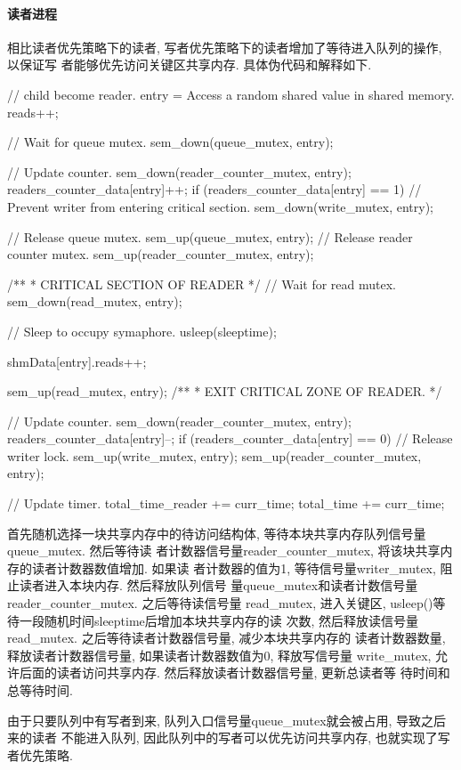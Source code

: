 \paragraph{读者进程}
相比读者优先策略下的读者, 写者优先策略下的读者增加了等待进入队列的操作, 以保证写
者能够优先访问关键区共享内存. 具体伪代码和解释如下.
\begin{code}
// child become reader.
    entry =  Access a random shared value in shared memory.
    reads++;

    // Wait for queue mutex.
    sem_down(queue_mutex, entry);

    // Update counter.
    sem_down(reader_counter_mutex, entry);
    readers_counter_data[entry]++;
    if (readers_counter_data[entry] == 1) {
            // Prevent writer from entering critical section.
            sem_down(write_mutex, entry);
        }

    // Release queue mutex.
    sem_up(queue_mutex, entry);
    // Release reader counter mutex.
    sem_up(reader_counter_mutex, entry);

    /**
    * CRITICAL SECTION OF READER
    */
    // Wait for read mutex.
    sem_down(read_mutex, entry);

    // Sleep to occupy symaphore.
    usleep(sleeptime);

    shmData[entry].reads++;

    sem_up(read_mutex, entry);
    /**
    * EXIT CRITICAL ZONE OF READER.
    */

    // Update counter.
    sem_down(reader_counter_mutex, entry);
    readers_counter_data[entry]--;
    if (readers_counter_data[entry] == 0) {
            // Release writer lock.
            sem_up(write_mutex, entry);
        }
    sem_up(reader_counter_mutex, entry);

    // Update timer.
    total_time_reader += curr_time;
    total_time += curr_time;

\end{code}

首先随机选择一块共享内存中的待访问结构体, 等待本块共享内存队列信号量queue\_mutex. 然后等待读
者计数器信号量reader\_counter\_mutex, 将该块共享内存的读者计数器数值增加. 如果读
者计数器的值为1, 等待信号量writer\_mutex, 阻止读者进入本块内存. 然后释放队列信号
量queue\_mutex和读者计数信号量reader\_counter\_mutex. 之后等待读信号量
read\_mutex, 进入关键区, usleep()等待一段随机时间sleeptime后增加本块共享内存的读
次数, 然后释放读信号量read\_mutex. 之后等待读者计数器信号量, 减少本块共享内存的
读者计数器数量, 释放读者计数器信号量, 如果读者计数器数值为0, 释放写信号量
write\_mutex, 允许后面的读者访问共享内存. 然后释放读者计数器信号量, 更新总读者等
待时间和总等待时间.\par

由于只要队列中有写者到来, 队列入口信号量queue\_mutex就会被占用, 导致之后来的读者
不能进入队列, 因此队列中的写者可以优先访问共享内存, 也就实现了写者优先策略.